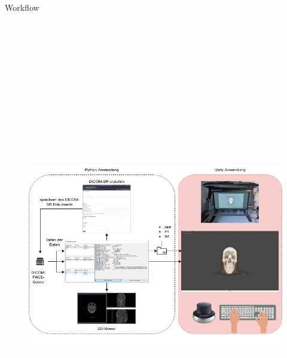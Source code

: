 \documentclass[final,hyperref={pdfpagelabels=false}]{beamer}
\begin{document}
\begin{frame}[t]
\begin{columns}[t]
\begin{column}{.465\textwidth}
\begin{block}{Workflow}
    \begin{figure}
        \centering
        \includegraphics[height=21cm]{workflow}
    \end{figure}
%
% 
    

\end{block}
\end{column}
\end{columns}
\end{frame}
\end{document}
